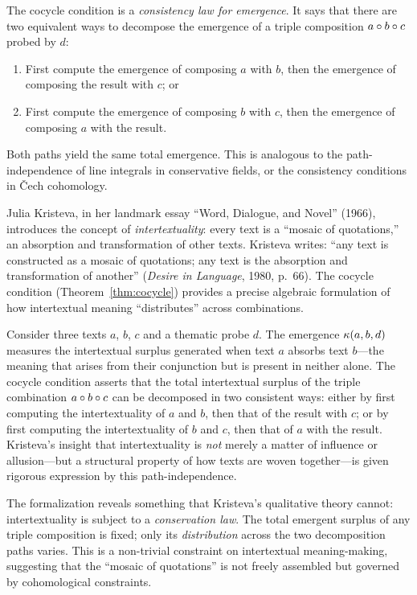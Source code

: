 \begin{interpretation}
The cocycle condition is a \emph{consistency law for emergence}. It says
that there are two equivalent ways to decompose the emergence of a triple
composition $a \circ b \circ c$ probed by $d$:
\begin{enumerate}
    \item First compute the emergence of composing $a$ with $b$, then
          the emergence of composing the result with $c$; or
    \item First compute the emergence of composing $b$ with $c$, then
          the emergence of composing $a$ with the result.
\end{enumerate}
Both paths yield the same total emergence. This is analogous to the
path-independence of line integrals in conservative fields, or the
consistency conditions in \v{C}ech cohomology.
\end{interpretation}

\begin{interpretation}\label{interp:ch2:kristeva_intertextuality}
Julia Kristeva, in her landmark essay ``Word, Dialogue, and Novel'' (1966),
introduces the concept of \emph{intertextuality}: every text is a
``mosaic of quotations,'' an absorption and transformation of other texts.
Kristeva writes: ``any text is constructed as a mosaic of quotations; any
text is the absorption and transformation of another'' (\emph{Desire in
Language}, 1980, p.~66). The cocycle condition (Theorem~\ref{thm:cocycle})
provides a precise algebraic formulation of how intertextual meaning
``distributes'' across combinations.

Consider three texts $a$, $b$, $c$ and a thematic probe $d$. The emergence
$\kappa(a, b, d)$ measures the intertextual surplus generated when text
$a$ absorbs text $b$---the meaning that arises from their conjunction but
is present in neither alone. The cocycle condition asserts that the
total intertextual surplus of the triple combination $a \circ b \circ c$
can be decomposed in two consistent ways: either by first computing the
intertextuality of $a$ and $b$, then that of the result with $c$; or by
first computing the intertextuality of $b$ and $c$, then that of $a$
with the result. Kristeva's insight that intertextuality is \emph{not}
merely a matter of influence or allusion---but a structural property
of how texts are woven together---is given rigorous expression by this
path-independence.

The formalization reveals something that Kristeva's qualitative theory
cannot: intertextuality is subject to a \emph{conservation law}. The
total emergent surplus of any triple composition is fixed; only its
\emph{distribution} across the two decomposition paths varies. This
is a non-trivial constraint on intertextual meaning-making, suggesting
that the ``mosaic of quotations'' is not freely assembled but
governed by cohomological constraints.
\end{interpretation}


